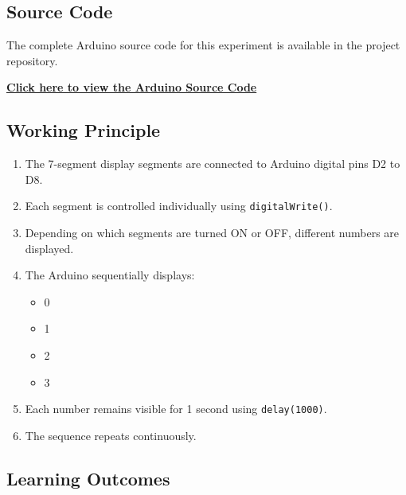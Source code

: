 \subsection{Source Code}

The complete Arduino source code for this experiment is available in the project repository.

\href{https://github.com/YOUR_USERNAME/YOUR_REPOSITORY/blob/main/Exp-0/7_segment_led/file.ino}
{\textbf{Click here to view the Arduino Source Code}}


\subsection{Working Principle}

\begin{enumerate}

\item The 7-segment display segments are connected to Arduino digital pins D2 to D8.

\item Each segment is controlled individually using \texttt{digitalWrite()}.

\item Depending on which segments are turned ON or OFF, different numbers are displayed.

\item The Arduino sequentially displays:

\begin{itemize}
\item 0
\item 1
\item 2
\item 3
\end{itemize}

\item Each number remains visible for 1 second using \texttt{delay(1000)}.

\item The sequence repeats continuously.

\end{enumerate}


\subsection{Learning Outcomes}

